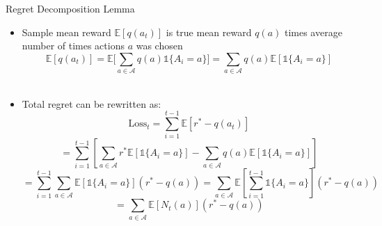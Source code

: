 \documentclass[11pt,table]{beamer}
\begin{document}
\begin{frame}{Regret Decomposition Lemma}
\begin{itemize}
\item Sample mean reward $\mathbb{E}[q(a_t)]$ is true mean reward $q(a)$ times average number of times actions $a$ was chosen
$$\mathbb{E}[q(a_t)]=\mathbb{E}\bigg[\sum_{a \in \mathcal{A}} q(a)\mathds{1} \{A_i = a\}\bigg]=\sum_{a \in \mathcal{A}} q(a)\mathbb{E}[\mathds{1} \{A_i = a\}]$$\\\pause
  \item Total regret can be rewritten as:
  \[
  \text{Loss}_t = \sum_{i=1}^{t-1}\mathbb{E}[r^* - q(a_t)]  \]\pause 
 \[= \sum_{i=1}^{t-1}\left[\sum_{a \in \mathcal{A}} r^*\mathbb{E}[\mathds{1} \{A_i = a\}] - \sum_{a \in \mathcal{A}} q(a)\mathbb{E}[\mathds{1} \{A_i = a\}]\right]
  \]\pause 
 \[
  = \sum_{i=1}^{t-1}\sum_{a \in \mathcal{A}}\mathbb{E}\left[\mathds{1} \{A_i = a\}\right](r^* -  q(a)) = \sum_{a \in \mathcal{A}}\mathbb{E}\left[\sum_{i=1}^{t-1}\mathds{1} \{A_i = a\}\right](r^* -  q(a))    \]\pause 
 \[= \sum_{a \in \mathcal{A}} \mathbb{E}[N_t(a)]  (r^* - q(a)) 
  \]
\end{itemize}

\end{frame}
\end{document}
